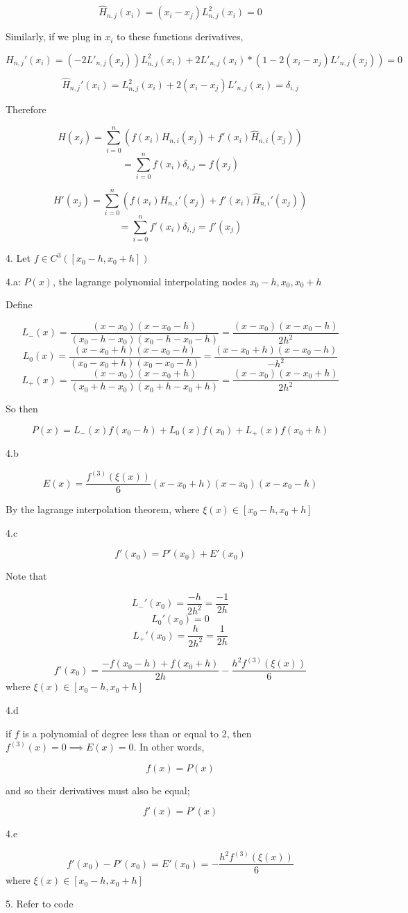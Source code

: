 \documentclass{article}
\begin{document}
$$\hat{H}_{n,j}(x_i) = (x_i-x_j)L^2_{n,j}(x_i) = 0$$

Similarly, if we plug in $x_i$ to these functions derivatives, 

$$H_{n,j}'(x_i) = (-2L'_{n,j}(x_j))L^2_{n,j}(x_i) + 2L'_{n,j}(x_i)*(1-2(x_i-x_j)L'_{n,j}(x_j))  = 0$$

$$\hat{H}_{n,j}'(x_i) = L^2_{n,j}(x_i)+2(x_i-x_j)L'_{n,j}(x_i) = \delta_{i,j}$$

Therefore 

$$H(x_j) =  \sum_{i=0}^n ( f(x_i)H_{n,i}(x_j) + f'(x_i )\hat{H}_{n,i}(x_j) ) $$
$$ = \sum_{i=0}^n f(x_i)\delta_{i,j}  = f(x_j)$$


$$H'(x_j) =  \sum_{i=0}^n ( f(x_i)H_{n,i}'(x_j) + f'(x_i )\hat{H}_{n,i}'(x_j) ) $$
$$ = \sum_{i=0}^n f'(x_i)\delta_{i,j}  = f'(x_j)$$

4.  Let $f \in C^3([x_0-h, x_0+h])$ 

4.a: $P(x)$, the lagrange polynomial interpolating nodes $x_0-h, x_0, x_0+h$

Define 

$$ L_{-}(x) = \frac{(x-x_0)(x-x_0-h)}{(x_0-h-x_0)(x_0-h-x_0-h)} = \frac{(x-x_0)(x-x_0-h)}{2h^2} $$
$$ L_{0}(x) = \frac{(x-x_0+h)(x-x_0-h)}{(x_0-x_0+h)(x_0-x_0-h)} =  \frac{(x-x_0+h)(x-x_0-h)}{-h^2} $$
$$ L_{+}(x) = \frac{(x-x_0)(x-x_0+h)}{(x_0+h-x_0)(x_0+h-x_0+h)} = \frac{(x-x_0)(x-x_0+h)}{2h^2} $$

So then 

$$P(x) = L_{-}(x)f(x_0-h) + L_0(x)f(x_0) + L_{+}(x)f(x_0+h)$$

4.b

$$E(x) = \frac{f^{(3)}(\xi(x))}{6}(x-x_0+h)(x-x_0)(x-x_0-h)$$ 

By the lagrange interpolation theorem, where $\xi(x) \in [x_0-h, x_0+h]$ 

4.c

$$f'(x_0) = P'(x_0) + E'(x_0)$$

Note that 

$$ L_{-}'(x_0) = \frac{-h}{2h^2} = \frac{-1}{2h} $$
$$ L_{0}'(x_0) =  0 $$
$$ L_{+}'(x_0) = \frac{h}{2h^2} = \frac{1}{2h} $$

$$f'(x_0) = \frac{-f(x_0-h) + f(x_0+h)}{2h} - \frac{h^2f^{(3)}(\xi(x))}{6} $$
where $\xi(x) \in [x_0-h, x_0+h]$ 

4.d 

if $f$ is a polynomial of degree less than or equal to 2, then $f^{(3)}(x) = 0 \implies E(x) = 0$. In other words,

$$f(x) = P(x)$$

and so their derivatives must also be equal;

$$f'(x) = P'(x)$$

4.e 

$$f'(x_0) - P'(x_0) = E'(x_0) = - \frac{h^2f^{(3)}(\xi(x))}{6} $$
where $\xi(x) \in [x_0-h, x_0+h]$ 


5. Refer to code
 
\end{document}

